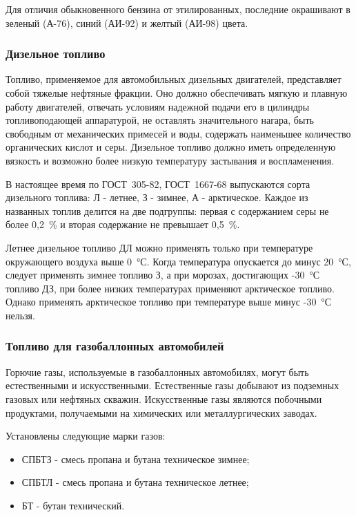 Для отличия обыкновенного бензина от этилированных, последние окрашивают в зеленый (\mbox{А-76}), синий (\mbox{АИ-92}) и желтый (\mbox{АИ-98}) цвета.




\subsubsection{Дизельное топливо}

Топливо, применяемое для автомобильных дизельных двигателей, представляет собой тяжелые нефтяные фракции. Оно должно обеспечивать мягкую и плавную работу двигателей, отвечать условиям надежной подачи его в цилиндры топливоподающей аппаратурой, не оставлять значительного нагара, быть свободным от механических примесей и воды, содержать наименьшее количество органических кислот и серы. Дизельное топливо должно иметь определенную вязкость и возможно более низкую температуру застывания и воспламенения.

В настоящее время по \mbox{ГОСТ 305-82}, \mbox{ГОСТ 1667-68} выпускаются сорта дизельного топлива: Л - летнее, З - зимнее, А - арктическое. Каждое из названных топлив делится на две подгруппы: первая с содержанием серы не более 0,2~\% и вторая содержание не превышает 0,5~\%.

Летнее дизельное топливо ДЛ можно применять только при температуре окружающего воздуха выше 0~°С. Когда температура опускается до минус 20~°С, следует применять зимнее топливо З, а при морозах, достигающих -30~°С топливо ДЗ, при более низких температурах применяют арктическое топливо. Однако применять арктическое топливо при температуре выше минус -30~°С нельзя.



\subsubsection{Топливо для газобаллонных автомобилей}

Горючие газы, используемые в газобаллонных автомобилях, могут быть естественными и искусственными. Естественные газы добывают из подземных газовых или нефтяных скважин. Искусственные газы являются побочными продуктами, получаемыми на химических или металлургических заводах. 

Установлены следующие марки газов:
\begin{itemize}
\item СПБТЗ - смесь пропана и бутана техническое зимнее;
\item СПБТЛ - смесь пропана и бутана техническое летнее;
\item БТ - бутан технический.
\end{itemize}

